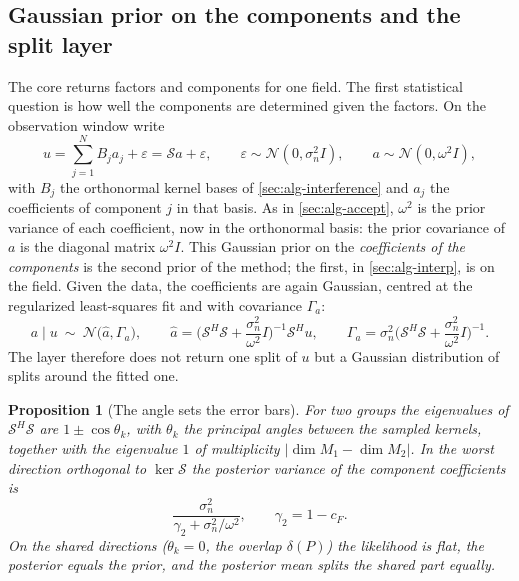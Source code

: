 \documentclass[11pt]{article}
\theoremstyle{plain}
\newtheorem{proposition}[theorem]{Proposition}
\theoremstyle{definition}
\theoremstyle{remark}
\newcommand{\sumop}{\mathcal{S}}            %
\newcommand{\cF}{c_{F}}                     %
\newcommand{\deltaP}{\delta(P)}             %
\newcommand{\noise}{\sigma_{n}}             %
\newcommand{\Normal}{\mathcal{N}}
\newcommand{\abs}[1]{\lvert#1\rvert}
\begin{document}
\subsection{Gaussian prior on the components and the split layer}\label{sec:bayes-split}
The core returns factors and components for one field. The first statistical question is how well the
components are determined given the factors. On the observation window write
\begin{equation}\label{eq:linmodel}
  u=\sum_{j=1}^NB_ja_j+\varepsilon=\sumop a+\varepsilon,\qquad \varepsilon\sim\Normal(0,\noise^2I),\qquad a\sim\Normal(0,\omega^2I),
\end{equation}
with $B_j$ the orthonormal kernel bases of \cref{sec:alg-interference} and $a_j$ the coefficients of component $j$ in
that basis. As in \cref{sec:alg-accept}, $\omega^2$ is the prior variance of each coefficient, now in the orthonormal
basis: the prior covariance of $a$ is the diagonal matrix $\omega^2I$. This Gaussian prior on the \emph{coefficients of the components} is the second
prior of the method; the first, in \cref{sec:alg-interp}, is on the field. Given the data, the coefficients are again
Gaussian, centred at the regularized least-squares fit and with covariance $\Gamma_a$:
\begin{equation}\label{eq:postcov}
  a\mid u\ \sim\ \Normal\big(\hat a,\Gamma_a\big),\qquad
  \hat a=\Big(\sumop^H\sumop+\frac{\noise^2}{\omega^2}I\Big)^{-1}\sumop^Hu,\qquad
  \Gamma_a=\noise^2\Big(\sumop^H\sumop+\frac{\noise^2}{\omega^2}I\Big)^{-1}.
\end{equation}
The layer therefore does not return one split of $u$ but a Gaussian distribution of splits around the fitted one.

\begin{proposition}[The angle sets the error bars]\label{prop:bayes-angle}
For two groups the eigenvalues of $\sumop^H\sumop$ are $1\pm\cos\theta_k$, with $\theta_k$ the principal
angles between the sampled kernels, together with the eigenvalue $1$ of multiplicity
$\abs{\dim M_1-\dim M_2}$. In the worst direction orthogonal to $\ker\sumop$ the posterior variance of the component
coefficients is
\begin{equation}\label{eq:worstvar}
  \frac{\noise^2}{\gamma_2+\noise^2/\omega^2},\qquad \gamma_2=1-\cF .
\end{equation}
On the shared directions ($\theta_k=0$, the overlap $\deltaP$) the likelihood is flat, the posterior equals
the prior, and the posterior mean splits the shared part equally.
\end{proposition}
\end{document}
